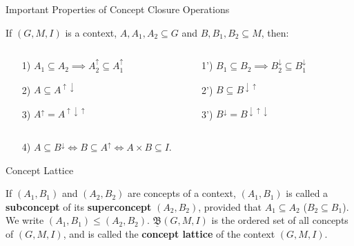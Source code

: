 \documentclass[pdf,xcolor=table]{beamer}
\begin{document}
\begin{frame}[t]{Important Properties of Concept Closure Operations}
    \begin{block}{\parencite[p. 18]{Ganter1999}}
        If $(G, M, I)$ is a context, $A, A_1, A_2 \subseteq G$ and $B, B_1, B_2 \subseteq M$, then:
        \begin{columns}
            \begin{column}{.44\textwidth}
                \begin{itemize}
                    \item[1)] $A_1 \subseteq A_2 \implies A^\uparrow_2 \subseteq A^\uparrow_1$
                    \item[2)] $A \subseteq A^{\uparrow\downarrow}$
                    \item[3)] $A^\uparrow = A^{\uparrow\downarrow\uparrow}$
                \end{itemize}
            \end{column}
            \begin{column}{.47\textwidth}
                \begin{itemize}
                    \item[1')] $B_1 \subseteq B_2 \implies B_2^\downarrow \subseteq B_1^{\downarrow}$
                    \item[2')] $B \subseteq B^{\downarrow\uparrow}$
                    \item[3')] $B^\downarrow = B^{\downarrow\uparrow\downarrow}$
                \end{itemize}
            \end{column}
        \end{columns}
        \begin{itemize}
            \item[4)] $A \subseteq B^\downarrow \iff B \subseteq A^\uparrow \iff A \times B \subseteq I$.
        \end{itemize}
    \end{block}
\end{frame}

\begin{frame}[t]{Concept Lattice}
    \begin{definition}
        If $(A_1, B_1)$ and $(A_2, B_2)$ are concepts of a context, $(A_1, B_1)$ is called a \textbf{subconcept} of its \textbf{superconcept} $(A_2, B_2)$, provided that $A_1 \subseteq A_2$ ($B_2 \subseteq B_1$).
        We write $(A_1, B_1) \leq (A_2, B_2)$.
        $\underline{\mathfrak{B}}(G, M, I)$ is the ordered set of all concepts of $(G, M, I)$, and is called the \textbf{concept lattice} of the context $(G, M, I)$.
    \end{definition}
\end{frame}
\end{document}
